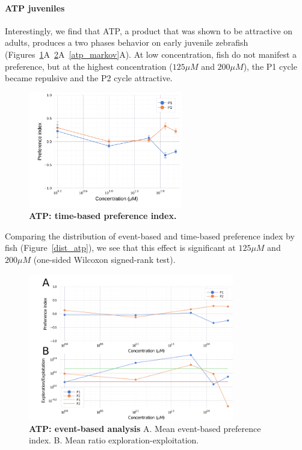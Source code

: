   \paragraph{ATP juveniles} Interestingly, we find that ATP, a product that was shown to be attractive on adults, produces a two phases behavior on early juvenile zebrafish (Figures~\ref{atp}A~\ref{atp_event}A~\ref{atp_markov}A). At low concentration, fish do not manifest a preference, but at the highest concentration ($125 \mu  M$  and $200 \mu M$), the P1 cycle became repulsive and the P2 cycle attractive.
    \begin{figure}[h!]
      \centering
      \includegraphics[width=0.6\textwidth]{part_2/assets/atp.png}
      \caption{\textbf{ATP: time-based preference index.} }
      \label{atp}
    \end{figure}
  Comparing the distribution of event-based and time-based preference index by fish (Figure~\ref{dist_atp}), we see that this effect is significant at $125 \mu M$ and  $200 \mu M$ (one-sided Wilcoxon signed-rank test).
    \begin{figure}[h!]
      \centering
      \includegraphics[width=0.8\textwidth]{part_2/assets/atp_event.png}
      \caption{\textbf{ATP: event-based analysis} A. Mean event-based preference index. B. Mean ratio exploration-exploitation.}
      \label{atp_event}
    \end{figure}
